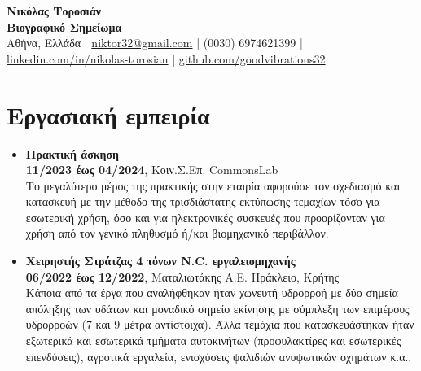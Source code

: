 \documentclass[a4paper,9pt]{extarticle}
\begin{document}
\newcommand{\en}[1]{\selectlanguage{english}\text{#1}\selectlanguage{greek}}
\pagestyle{empty}

\begin{center}
\textbf{\Large Νικόλας Τοροσιάν }\\[3pt] %
\textbf{Βιογραφικό Σημείωμα}\\[1pt] %
Αθήνα, Ελλάδα
| \href{mailto:niktor32@gmail.com}{niktor32@gmail.com} | (0030) 6974621399 | \href{https://www.linkedin.com/in/nikolas-torosian-700235273/}{linkedin.com/in/nikolas-torosian} | \href{https://github.com/goodvibrations32/}{github.com/goodvibrations32}   %
\end{center}


\section*{Εργασιακή εμπειρία}
\noindent
\begin{itemize}
  \item{\textbf{Πρακτική άσκηση}}\\
        \textbf{11/2023 έως 04/2024}, Κοιν.Σ.Επ. CommonsLab \\
        Το μεγαλύτερο μέρος της πρακτικής στην εταιρία αφορούσε τον σχεδιασμό και κατασκευή με την μέθοδο της τρισδιάστατης εκτύπωσης τεμαχίων τόσο για εσωτερική χρήση, όσο και για ηλεκτρονικές συσκευές που προορίζονταν για χρήση από τον γενικό πληθυσμό ή/και βιομηχανικό περιβάλλον. \\
  \item{\textbf{Χειρηστής Στράτζας 4 τόνων N.C.  εργαλειομηχανής}} \\
        \textbf{06/2022 έως 12/2022}, Ματαλιωτάκης Α.Ε. Ηράκλειο, Κρήτης \\
        Κάποια από τα έργα που αναλήφθηκαν ήταν χωνευτή υδρορροή με δύο σημεία απόληξης των υδάτων και μοναδικό σημείο εκίνησης με σύμπλεξη των επιμέρους υδρορροών (7 και 9 μέτρα αντίστοιχα). Άλλα τεμάχια που κατασκευάστηκαν ήταν εξωτερικά και εσωτερικά τμήματα αυτοκινήτων (προφυλακτίρες και εσωτερικές επενδύσεις), αγροτικά εργαλεία, ενισχύσεις ψαλιδιών ανυψωτικών οχημάτων κ.α.. \\
\end{itemize}

\end{document}
